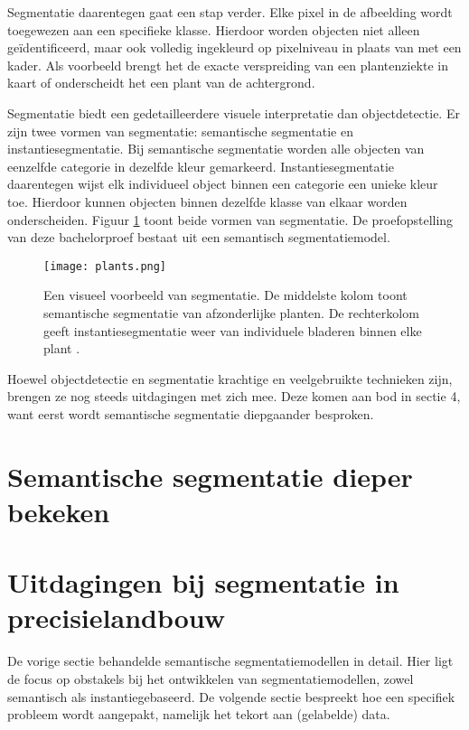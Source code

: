Segmentatie daarentegen gaat een stap verder. Elke pixel in de afbeelding wordt toegewezen aan een specifieke klasse. Hierdoor worden objecten niet alleen geïdentificeerd, maar ook volledig ingekleurd op pixelniveau in plaats van met een kader. Als voorbeeld brengt het de exacte verspreiding van een plantenziekte in kaart of onderscheidt het een plant van de achtergrond.
 
Segmentatie biedt een gedetailleerdere visuele interpretatie dan objectdetectie. Er zijn twee vormen van segmentatie: semantische segmentatie en instantiesegmentatie. Bij semantische segmentatie worden alle objecten van eenzelfde categorie in dezelfde kleur gemarkeerd. Instantiesegmentatie daarentegen wijst elk individueel object binnen een categorie een unieke kleur toe. Hierdoor kunnen objecten binnen dezelfde klasse van elkaar worden onderscheiden. Figuur \ref{fig:plants} toont beide vormen van segmentatie. De proefopstelling van deze bachelorproef bestaat uit een semantisch segmentatiemodel. 

\begin{figure}
    \centering
    \texttt{[image: plants.png]}
    \caption[Voorbeeld segmentatie.]{\label{fig:plants}Een visueel voorbeeld van segmentatie. De middelste kolom toont semantische segmentatie van afzonderlijke planten. De rechterkolom geeft instantiesegmentatie weer van individuele bladeren binnen elke plant \autocite{Lei2024}.}
\end{figure}

Hoewel objectdetectie en segmentatie krachtige en veelgebruikte technieken zijn, brengen ze nog steeds uitdagingen met zich mee. Deze komen aan bod in sectie 4, want eerst wordt semantische segmentatie diepgaander besproken.

\section{Semantische segmentatie dieper bekeken}

\section{Uitdagingen bij segmentatie in precisielandbouw}

De vorige sectie behandelde semantische segmentatiemodellen in detail. Hier ligt de focus op obstakels bij het ontwikkelen van segmentatiemodellen, zowel semantisch als instantiegebaseerd. De volgende sectie bespreekt hoe een specifiek probleem wordt aangepakt, namelijk het tekort aan (gelabelde) data.

